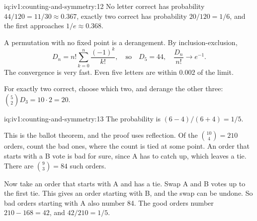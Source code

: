 \begin{solution}{iq:iv1:counting-and-symmetry:12}
No letter correct has probability $44/120 = 11/30 \approx 0.367$, exactly two correct has probability $20/120 = 1/6$, and the first approaches $1/e \approx 0.368$.

A permutation with no fixed point is a derangement. By inclusion-exclusion,
\[
D_n = n! \sum_{k=0}^{n} \frac{(-1)^k}{k!}, \quad\text{so}\quad D_5 = 44, \quad \frac{D_n}{n!} \to e^{-1}.
\]
The convergence is very fast. Even five letters are within $0.002$ of the limit.

For exactly two correct, choose which two, and derange the other three: $\binom{5}{2} D_3 = 10 \cdot 2 = 20$.

\end{solution}

\enlargethispage{-3\baselineskip}%
\begin{solution}{iq:iv1:counting-and-symmetry:13}
The probability is $(6 - 4)/(6 + 4) = 1/5$.

This is the ballot theorem, and the proof uses reflection. Of the $\binom{10}{4} = 210$ orders, count the bad ones, where the count is tied at some point. An order that starts with a B vote is bad for sure, since A has to catch up, which leaves a tie. There are $\binom{9}{3} = 84$ such orders.

Now take an order that starts with A and has a tie. Swap A and B votes up to the first tie. This gives an order starting with B, and the swap can be undone. So bad orders starting with A also number 84. The good orders number $210 - 168 = 42$, and $42/210 = 1/5$.

\end{solution}

